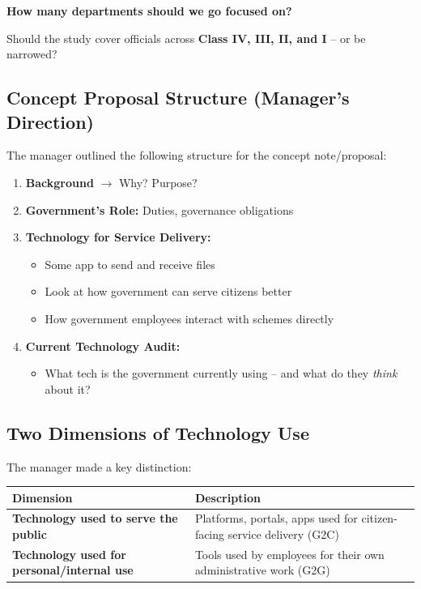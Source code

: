 \documentclass[12pt,a4paper]{article}
\begin{document}
\begin{actionbox}
\textbf{How many departments should we go focused on?}

Should the study cover officials across \textbf{Class IV, III, II, and I} -- or be narrowed?
\end{actionbox}

\subsection{Concept Proposal Structure (Manager's Direction)}

The manager outlined the following structure for the concept note/proposal:

\begin{enumerate}[label=\textbf{\arabic*.}]
  \item \textbf{Background} $\rightarrow$ Why? Purpose?
  \item \textbf{Government's Role:} Duties, governance obligations
  \item \textbf{Technology for Service Delivery:}
    \begin{itemize}
      \item Some app to send and receive files
      \item Look at how government can serve citizens better
      \item How government employees interact with schemes directly
    \end{itemize}
  \item \textbf{Current Technology Audit:}
    \begin{itemize}
      \item What tech is the government currently using -- and what do they \textit{think} about it?
    \end{itemize}
\end{enumerate}

\subsection{Two Dimensions of Technology Use}

The manager made a key distinction:

\begin{table}[h!]
\centering
\begin{tabularx}{\textwidth}{@{}lX@{}}
\toprule
\textbf{Dimension} & \textbf{Description} \\
\midrule
\textbf{Technology used to serve the public} & Platforms, portals, apps used for citizen-facing service delivery (G2C) \\
\textbf{Technology used for personal/internal use} & Tools used by employees for their own administrative work (G2G) \\
\bottomrule
\end{tabularx}
\end{table}
\end{document}
